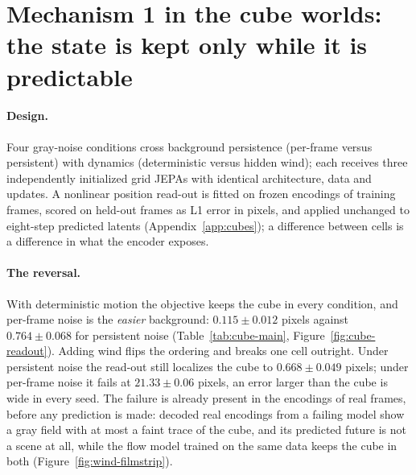 \section{Mechanism 1 in the cube worlds: the state is kept only while it is predictable}
\label{sec:representation}

\paragraph{Design.}
Four gray-noise conditions cross background persistence (per-frame versus persistent) with
dynamics (deterministic versus hidden wind); each receives three independently initialized grid
JEPAs with identical architecture, data and updates. A nonlinear position read-out is fitted on
frozen encodings of training frames, scored on held-out frames as L1 error in pixels, and applied
unchanged to eight-step predicted latents (Appendix~\ref{app:cubes}); a difference between cells is
a difference in what the encoder exposes.

\begin{table}[t]
\centering
\caption{\textbf{The effect of nuisance persistence reverses under stochastic dynamics.} Cube
position L1 error in pixels, mean $\pm$ sample standard deviation over three model fits. ``Real''
reads encodings of held-out observations; the right column applies the same read-out eight
predicted steps ahead. Architecture, latent size, data and updates are fixed across cells.}
\label{tab:cube-main}
\end{table}

\paragraph{The reversal.}
With deterministic motion the objective keeps the cube in every condition, and per-frame noise is
the \emph{easier} background: $0.115\pm0.012$ pixels against $0.764\pm0.068$ for persistent noise
(Table~\ref{tab:cube-main}, Figure~\ref{fig:cube-readout}). Adding wind flips the ordering and
breaks one cell outright. Under persistent noise the read-out still localizes the cube to
$0.668\pm0.049$ pixels; under per-frame noise it fails at $21.33\pm0.06$ pixels, an error larger
than the cube is wide in every seed. The failure is already present in the encodings of real
frames, before any prediction is made: decoded real encodings from a failing model show a gray
field with at most a faint trace of the cube, and its predicted future is not a scene at all, while
the flow model trained on the same data keeps the cube in both (Figure~\ref{fig:wind-filmstrip}).

